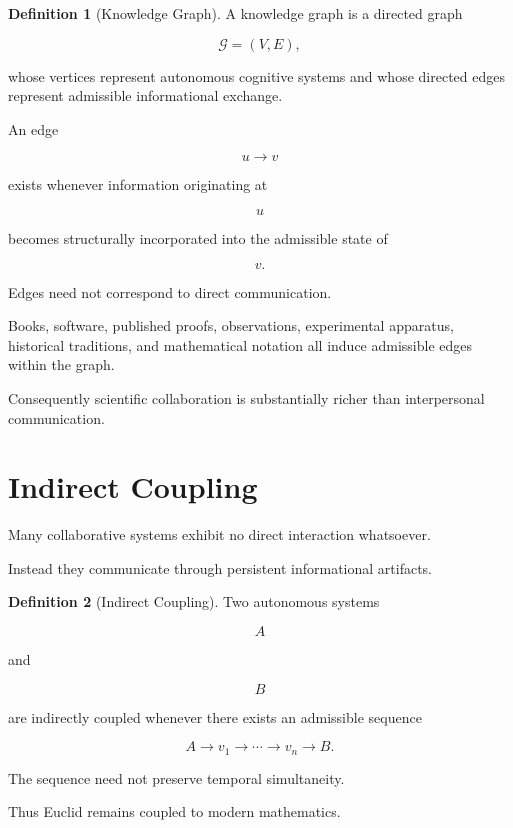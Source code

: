 \documentclass[11pt,oneside]{book}
\numberwithin{equation}{chapter}
\theoremstyle{definition}
\newtheorem{definition}{Definition}[chapter]
\theoremstyle{plain}
\begin{document}
\begin{definition}[Knowledge Graph]

A knowledge graph is a directed graph

\[
\mathcal{G}
=
(V,E),
\]

whose vertices represent autonomous cognitive systems and whose directed
edges represent admissible informational exchange.

An edge

\[
u\rightarrow v
\]

exists whenever information originating at

\[
u
\]

becomes structurally incorporated into the admissible state of

\[
v.
\]

\end{definition}

Edges need not correspond to direct communication.

Books, software, published proofs, observations, experimental apparatus,
historical traditions, and mathematical notation all induce admissible edges
within the graph.

Consequently scientific collaboration is substantially richer than
interpersonal communication.

\section{Indirect Coupling}

Many collaborative systems exhibit no direct interaction whatsoever.

Instead they communicate through persistent informational artifacts.

\begin{definition}[Indirect Coupling]

Two autonomous systems

\[
A
\]

and

\[
B
\]

are indirectly coupled whenever there exists an admissible sequence

\[
A
\rightarrow
v_1
\rightarrow
\cdots
\rightarrow
v_n
\rightarrow
B.
\]

The sequence need not preserve temporal simultaneity.

\end{definition}

Thus Euclid remains coupled to modern mathematics.
\end{document}
